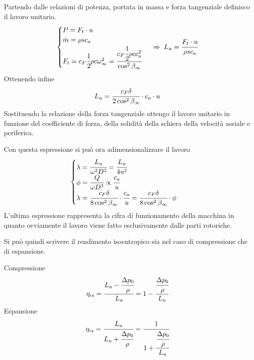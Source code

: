 Partendo dalle relazioni di potenza, portata in massa e forza tangenziale definisco il lavoro unitario.
\begin{align*}
\begin{cases}
P=F_t \cdot u\\
\dot{m} = \rho s c_a\\
F_t = c_F \cfrac{1}{2} \rho c \omega_{\infty}^2 = \cfrac{c_F \cfrac{1}{2} \rho c c_a^2}{\cos^2 \beta_{\infty}}
\end{cases} \;
\Rightarrow \;
L_u = \cfrac{F_t \cdot u}{\rho s c_a}
\end{align*}
Ottenendo infine
\begin{align*}
L_u = \cfrac{c_F \delta}{2 \cos^2 \beta_{\infty}} \cdot c_a \cdot u
\end{align*}
Sostituendo la relazione della forza tangenziale ottengo il lavoro unitario in funzione del coefficiente di forza, della solidità della schiera della velocità assiale e periferica. 

Con questa espressione si può ora adimensionalizzare il lavoro
\begin{align*}
\begin{cases}
\lambda = \cfrac{L_u}{\omega ^2 D^2} = \cfrac{L_u}{4 u^2}\\
\phi = \cfrac{Q}{\omega D^3} \propto \cfrac{c_a}{u} \\
\lambda = \cfrac{c_F \delta}{8 \cos^2 \beta_{\infty}} \cdot \cfrac{c_a}{u} = \cfrac{c_F \delta}{8 \cos^2 \beta_{\infty}} \cdot \phi
\end{cases}
\end{align*}
L'ultima espressione rappresenta la cifra di funzionamento della macchina in quanto ovviamente il lavoro viene fatto esclusivamente dalle parti rotoriche.

Si può quindi scrivere il rendimento isoentropico sia nel caso di compressione che di espansione. 

\begin{multicols}{2}
Compressione
\begin{align*}
\eta_{is} = \cfrac{L_u - \cfrac{\Delta p_0}{\rho}}{L_u} = 1- \cfrac{\cfrac{\Delta p_0}{\rho}}{L_u}
\end{align*}
\break
Espansione
\begin{align*}
\eta_{is} = \cfrac{L_u}{L_u + \cfrac{\Delta p_0}{\rho}} = \cfrac{1}{1+\cfrac{\cfrac{\Delta p_0}{\rho}}{L_u}}
\end{align*}
\end{multicols}

